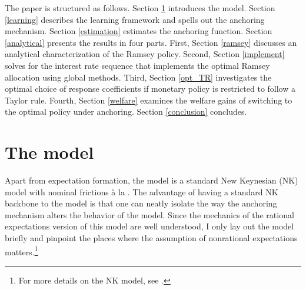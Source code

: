 \documentclass[11pt]{article}
\renewcommand{\[}{\begin{equation}}
\renewcommand{\]}{\end{equation}}
\begin{document}
The paper is structured as follows. Section \ref{NK} introduces the model. Section \ref{learning} describes the learning framework and spells out the anchoring mechanism. Section \ref{estimation} estimates the anchoring function. Section \ref{analytical} presents the results in four parts. First, Section \ref{ramsey} discusses an analytical characterization of the Ramsey policy. Second, Section \ref{implement} solves for the interest rate sequence that implements the optimal Ramsey allocation using global methods. Third, Section \ref{opt_TR} investigates the optimal choice of response coefficients if monetary policy is restricted to follow a Taylor rule. Fourth, Section \ref{welfare} examines the welfare gains of switching to the optimal policy under anchoring. Section \ref{conclusion} concludes.

\section{The model}\label{NK}
Apart from expectation formation, the model is a standard New Keynesian (NK) model with nominal frictions \`a la \cite{calvo1983staggered}. The advantage of having a standard NK backbone to the model is that one can neatly isolate the way the anchoring mechanism alters the behavior of the model. Since the mechanics of the rational expectations version of this model are well understood, I only lay out the model briefly and pinpoint the places where the assumption of nonrational expectations matters.\footnote{For more details on the NK model, see \cite{woodford2011interest}.}
\end{document}
